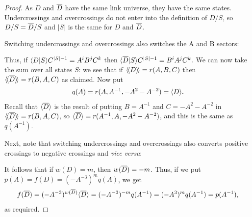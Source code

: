 \documentclass[reqno]{amsart}
\theoremstyle{definition}
\begin{document}
\begin{proof}
 As $D$ and $\overline{D}$ have the same link universe, they have the same
 states.  Undercrossings and overcrossings do not enter into the
 definition of $D/S$, so $D/S=\overline{D}/S$ and $|S|$ is the same for $D$
 and $\overline{D}$.

 Switching undercrossings and overcrossings also switches the
 A and B sectors:
 \begin{center}
 \end{center}
 Thus, if $\langle D|S\rangle C^{|S|-1}=A^iB^jC^k$ then
 $\langle \overline{D}|S\rangle C^{|S|-1}=B^iA^jC^k$.  We can now take the sum over all states
 $S$: we see that if $\langle\!\langle D\rangle\!\rangle=r(A,B,C)$ then $\langle\!\langle \overline{D}\rangle\!\rangle=r(B,A,C)$ as
 claimed.  Now put 
 \[ q(A) = r(A,A^{-1},-A^2-A^{-2}) = \langle D\rangle. \]
 Recall that $\langle \overline{D}\rangle$ is the result of putting $B=A^{-1}$ and
 $C=-A^2-A^{-2}$ in $\langle\!\langle \overline{D}\rangle\!\rangle=r(B,A,C)$, so 
 $\langle \overline{D}\rangle=r(A^{-1},A,-A^2-A^{-2})$, and this is the same as
 $q(A^{-1})$.

 Next, note that switching undercrossings and overcrossings also
 converts positive crossings to negative crossings and \emph{vice
  versa}: 
 \begin{center}
 \end{center}
 It follows that if $w(D)=m$, then $w(\overline{D})=-m$.  Thus, if we put
 $p(A)=f(D)=(-A^{-3})^{m}q(A)$, we get 
 \[ f(\overline{D}) = (-A^{-3})^{w(\overline{D})} \langle \overline{D}\rangle
      = (-A^{-3})^{-m} q(A^{-1}) = (-A^3)^m q(A^{-1}) 
      = p(A^{-1}),
 \]
 as required.
\end{proof}
\end{document}
